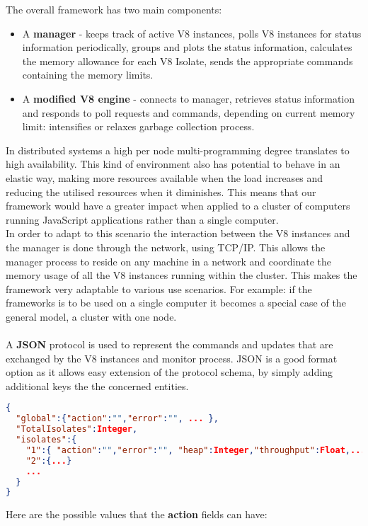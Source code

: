 \documentclass{l4proj}
\begin{document}
The overall framework has two main components:
\begin{itemize}
\item A \textbf{manager} - keeps track of active V8 instances, polls V8 instances for status information periodically, groups and plots the status information, calculates the memory allowance for each V8 Isolate, sends the appropriate commands containing the memory limits.
\item A \textbf{modified V8 engine} - connects to manager, retrieves status information and responds to poll requests and commands, depending on current memory limit: intensifies or relaxes garbage collection process.
\end{itemize}
\hspace*{3em} In distributed systems a high per node multi-programming degree translates to high availability. This kind of environment also has potential to behave in an elastic way, making more resources available when the load increases and reducing the utilised resources when it diminishes. This means that our framework would have a greater impact when applied to a cluster of computers running JavaScript applications rather than a single computer.\\
\hspace*{3em} In order to adapt to this scenario the interaction between the V8 instances and the manager is done through the network, using TCP/IP. This allows the manager process to reside on any machine in a network and coordinate the memory usage of all the V8 instances running within the cluster. This makes the framework very adaptable to various use scenarios. For example: if the frameworks is to be used on a single computer it becomes a special case of the general model, a cluster with one node.
\\\\
\hspace*{3em} A \textbf{JSON} protocol is used to represent the commands and updates that are exchanged by the V8 instances and monitor process. JSON is a good format option as it allows easy extension of the protocol schema, by simply adding additional keys the the concerned entities.
\begin{lstlisting}[language=json,firstnumber=1]
{
  "global":{"action":"","error":"", ... },
  "TotalIsolates":Integer,
  "isolates":{
    "1":{ "action":"","error":"", "heap":Integer,"throughput":Float,... },
    "2":{...}
    ...
  }
}
\end{lstlisting}
Here are the possible values that the \textbf{action} fields can have:\\\\
\end{document}
